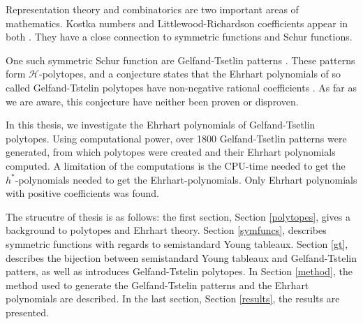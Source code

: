 Representation theory and combinatorics are two important areas of mathematics. 
Kostka numbers and Littlewood-Richardson coefficients appear in both \cite{narayanan2006complexity}. 
They have a close connection to symmetric functions and Schur functions. 

One such symmetric Schur function are Gelfand-Tsetlin patterns \cite{StanleyEC2}. 
These patterns form $\mathcal{H}$-polytopes, and a conjecture states that the Ehrhart polynomials of so called Gelfand-Tstelin polytopes have non-negative rational coefficients \cite{KingTolluToumazet2004}. 
As far as we are aware, this conjecture have neither been proven or disproven. 

In this thesis, we investigate the Ehrhart polynomials of Gelfand-Tsetlin polytopes. 
Using computational power, over 1800 Gelfand-Tsetlin patterns were generated, from which polytopes were created and their Ehrhart polynomials computed. 
A limitation of the computations is the CPU-time needed to get the $h^*$-polynomials needed to get the Ehrhart-polynomials. 
Only Ehrhart polynomials with positive coefficients was found. 

The strucutre of thesis is as follows: the first section, Section \ref{polytopes}, gives a background to polytopes and Ehrhart theory. 
Section \ref{symfuncs}, describes symmetric functions with regards to semistandard Young tableaux. Section \ref{gt}, describes the bijection between semistandard Young tableaux and Gelfand-Tstelin patters, as well as introduces Gelfand-Tstelin polytopes. 
In Section \ref{method}, the method used to generate the Gelfand-Tstelin patterns and the Ehrhart polynomials are described. In the last section, Section \ref{results}, the results are presented. 